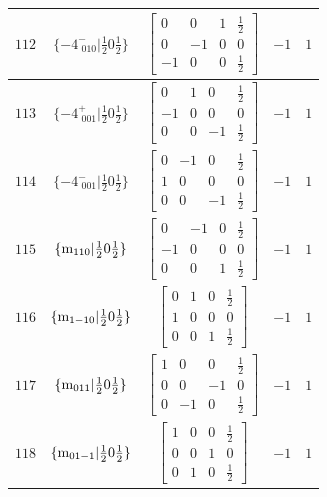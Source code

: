 \documentclass[fleqn,8pt]{jsarticle}
\begin{document}
\begin{longtable}{ccccc}
$ 112 $ & $ \{-4^{-}_{\,\,010}|\frac{1}{2} 0 \frac{1}{2}\} $ & $ \begin{bmatrix} 0 & 0 & 1 & \frac{1}{2} \\ 0 & -1 & 0 & 0 \\ -1 & 0 & 0 & \frac{1}{2} \end{bmatrix} $ & $ -1 $ & $ 1 $ \\ \hline
$ 113 $ & $ \{-4^{+}_{\,\,001}|\frac{1}{2} 0 \frac{1}{2}\} $ & $ \begin{bmatrix} 0 & 1 & 0 & \frac{1}{2} \\ -1 & 0 & 0 & 0 \\ 0 & 0 & -1 & \frac{1}{2} \end{bmatrix} $ & $ -1 $ & $ 1 $ \\ \hline
$ 114 $ & $ \{-4^{-}_{\,\,001}|\frac{1}{2} 0 \frac{1}{2}\} $ & $ \begin{bmatrix} 0 & -1 & 0 & \frac{1}{2} \\ 1 & 0 & 0 & 0 \\ 0 & 0 & -1 & \frac{1}{2} \end{bmatrix} $ & $ -1 $ & $ 1 $ \\ \hline
$ 115 $ & $ \{{\rm m}_{110}|\frac{1}{2} 0 \frac{1}{2}\} $ & $ \begin{bmatrix} 0 & -1 & 0 & \frac{1}{2} \\ -1 & 0 & 0 & 0 \\ 0 & 0 & 1 & \frac{1}{2} \end{bmatrix} $ & $ -1 $ & $ 1 $ \\ \hline
$ 116 $ & $ \{{\rm m}_{1-10}|\frac{1}{2} 0 \frac{1}{2}\} $ & $ \begin{bmatrix} 0 & 1 & 0 & \frac{1}{2} \\ 1 & 0 & 0 & 0 \\ 0 & 0 & 1 & \frac{1}{2} \end{bmatrix} $ & $ -1 $ & $ 1 $ \\ \hline
$ 117 $ & $ \{{\rm m}_{011}|\frac{1}{2} 0 \frac{1}{2}\} $ & $ \begin{bmatrix} 1 & 0 & 0 & \frac{1}{2} \\ 0 & 0 & -1 & 0 \\ 0 & -1 & 0 & \frac{1}{2} \end{bmatrix} $ & $ -1 $ & $ 1 $ \\ \hline
$ 118 $ & $ \{{\rm m}_{01-1}|\frac{1}{2} 0 \frac{1}{2}\} $ & $ \begin{bmatrix} 1 & 0 & 0 & \frac{1}{2} \\ 0 & 0 & 1 & 0 \\ 0 & 1 & 0 & \frac{1}{2} \end{bmatrix} $ & $ -1 $ & $ 1 $ \\ \hline

\end{longtable}
\end{document}

